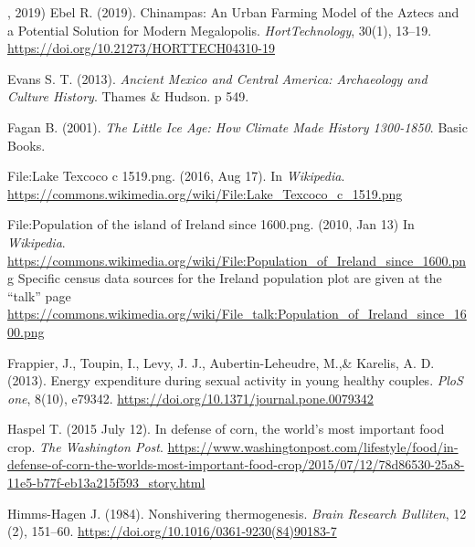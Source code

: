 \documentclass[onecolumn]{article}
\begin{document}
\begin{thebibliography}{99}
, 2019)
Ebel R. 
(2019).
Chinampas: An Urban Farming Model of the Aztecs and a Potential Solution for Modern Megalopolis.
\textit{HortTechnology},
30(1), 13--19.
\url{https://doi.org/10.21273/HORTTECH04310-19}

Evans S. T.
(2013).
\textit{Ancient Mexico and Central America: Archaeology and Culture History}.
Thames \& Hudson.
p 549.

Fagan B.
(2001).
\textit{The Little Ice Age: How Climate Made History 1300-1850}.
Basic Books.

File:Lake Texcoco c 1519.png.
(2016, Aug 17).
In \textit{Wikipedia}.
\url{https://commons.wikimedia.org/wiki/File:Lake\_Texcoco\_c\_1519.png}


File:Population of the island of Ireland since 1600.png.
(2010, Jan 13)
In \textit{Wikipedia}.
\url{https://commons.wikimedia.org/wiki/File:Population\_of\_Ireland\_since\_1600.png}
Specific census data sources for the Ireland population plot are given at the ``talk'' page 
\url{https://commons.wikimedia.org/wiki/File\_talk:Population\_of\_Ireland\_since\_1600.png}


Frappier, J., Toupin, I., Levy, J. J., Aubertin-Leheudre, M.,\& Karelis, A. D. 
(2013). 
Energy expenditure during sexual activity in young healthy couples. 
\textit{PloS one}, 8(10), e79342. 
\url{https://doi.org/10.1371/journal.pone.0079342}

Haspel T.
(2015 July 12). 
In defense of corn, the world’s most important food crop.
\textit{The Washington Post}.
\url{https://www.washingtonpost.com/lifestyle/food/in-defense-of-corn-the-worlds-most-important-food-crop/2015/07/12/78d86530-25a8-11e5-b77f-eb13a215f593_story.html}

Himms-Hagen J.
(1984).
Nonshivering thermogenesis. 
\textit{Brain Research Bulliten},
12 (2),
151--60.
\url{https://doi.org/10.1016/0361-9230(84)90183-7}


\end{thebibliography}
\end{document}
